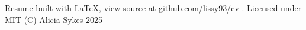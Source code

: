 \documentclass[]{resume-format}
\begin{document}
\vspace{5mm}
\begin{center}
    \tiny\color{lightgray}
    Resume built with LaTeX, view source at
    \href{https://github.com/lissy93/cv}{ github.com/lissy93/cv }.
    Licensed under MIT (C)
    \href{https://aliciasykes.com}{ Alicia Sykes } 2025
\end{center}
\ 
\end{document}
